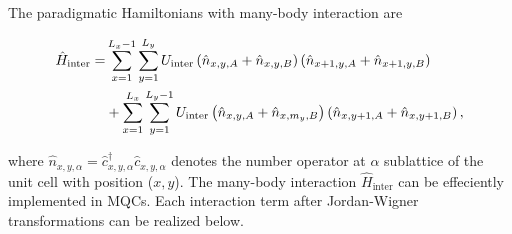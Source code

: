 \documentclass[longbibliography, aps, prx, amsmath, amssymb, amsfonts, twocolumn,superscriptaddress, footinbib]{revtex4-1}
\begin{document}

	The paradigmatic Hamiltonians with many-body interaction are
	\begin{widetext}
		\begin{align}
			\hat{H}_{\text{inter}} = &\sum_{{x}=1}^{L_{x}-1} \sum_{{y}=1}^{L_{y}}  U_{\text{inter}} \left(\hat{n}_{{x}, {y}, A}+\hat{n}_{{x}, {y}, B}\right) \left(\hat{n}_{{x}+1, {y}, A}+\hat{n}_{{x}+1, {y}, B}\right)\notag\\
			& + 
			\sum_{{x}=1}^{L_{x}} \sum_{{y}=1}^{L_{y}-1}  U_{\text{inter}} \left(\hat{n}_{{x}, {y}, A}+\hat{n}_{{x}, m_y, B}\right) \left(\hat{n}_{{x}, {y}+1, A}+\hat{n}_{{x}, {y}+1, B}\right),\\
		\end{align}
	\end{widetext}
	where $\hat{n}_{{x},{y},\alpha}=\hat{c}_{x,y,\alpha}^{\dagger}\hat{c}_{x,y,\alpha}$ denotes the number operator at $\alpha$ sublattice of the unit cell with position (${x},{y}$).
	The many-body interaction $\hat{H}_{\text{inter}}$ can be effeciently implemented in MQCs. Each interaction term after Jordan-Wigner transformations can be realized below.
\end{document}
